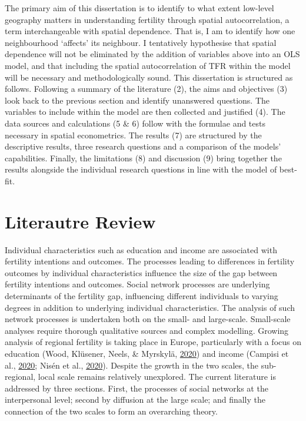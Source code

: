 \documentclass[12pt,twoside]{reedthesis}
\begin{document}
The primary aim of this dissertation is to identify to what extent low-level geography matters in understanding fertility through spatial autocorrelation, a term interchangeable with spatial dependence. That is, I am to identify how one neighbourhood `affects' its neighbour. I tentatively hypothesise that spatial dependence will not be eliminated by the addition of variables above into an OLS model, and that including the spatial autocorrelation of TFR within the model will be necessary and methodologically sound. This dissertation is structured as follows. Following a summary of the literature (2), the aims and objectives (3) look back to the previous section and identify unanswered questions. The variables to include within the model are then collected and justified (4). The data sources and calculations (5 \& 6) follow with the formulae and tests necessary in spatial econometrics. The results (7) are structured by the descriptive results, three research questions and a comparison of the models' capabilities. Finally, the limitations (8) and discussion (9) bring together the results alongside the individual research questions in line with the model of best-fit.

\hypertarget{Review}{%
\chapter{Literautre Review}\label{Review}}

Individual characteristics such as education and income are associated with fertility intentions and outcomes. The processes leading to differences in fertility outcomes by individual characteristics influence the size of the gap between fertility intentions and outcomes. Social network processes are underlying determinants of the fertility gap, influencing different individuals to varying degrees in addition to underlying individual characteristics. The analysis of such network processes is undertaken both on the small- and large-scale. Small-scale analyses require thorough qualitative sources and complex modelling. Growing analysis of regional fertility is taking place in Europe, particularly with a focus on education (Wood, Klüsener, Neels, \& Myrskylä, \protect\hyperlink{ref-wood2020}{2020}) and income (Campisi et al., \protect\hyperlink{ref-campisi2020}{2020}; Nisén et al., \protect\hyperlink{ref-nisen2020}{2020}). Despite the growth in the two scales, the sub-regional, local scale remains relatively unexplored. The current literature is addressed by three sections. First, the processes of social networks at the interpersonal level; second by diffusion at the large scale; and finally the connection of the two scales to form an overarching theory.
\end{document}
